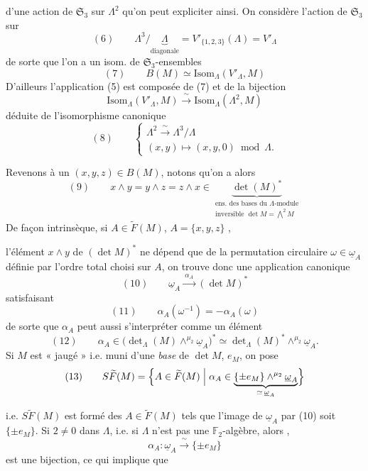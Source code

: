 \documentclass[11pt,a4paper]{article}
\begin{document}
d'une action de $\mathfrak{S}_3$ sur  $\Lambda^2$ qu'on peut expliciter ainsi. On considère l'action de $\mathfrak{S}_3$ sur
\[
(6)\qquad \Lambda^3/\underbrace{\Lambda}_{\text{diagonale}} = V'_{\{1,2,3\}}(\Lambda) = V'_\Lambda
\]
de sorte que l'on a un isom.  de $\mathfrak{S}_3$-ensembles
\[
(7)\qquad B(M) \simeq \mathrm{Isom}_\Lambda(V'_\Lambda, M)
\]
D'ailleurs l'application (5) est composée de (7) et de la bijection
\[
\mathrm{Isom}_\Lambda(V'_\Lambda, M) \xrightarrow{\ \sim\ } \mathrm{Isom}_\Lambda(\Lambda^2, M)
\]
déduite de l'isomorphisme canonique
\[
(8)\qquad \begin{cases} \Lambda^2 \xrightarrow{\ \sim\ } \Lambda^3/\Lambda \\ (x,y) \longmapsto (x,y,0) \bmod \Lambda . \end{cases}
\]

Revenons à un $(x,y,z) \in B(M)$, notons qu'on a alors
\[
(9)\qquad x \wedge y = y \wedge z = z \wedge x \in \underbrace{\det(M)^*}_{\substack{\text{ens. des bases du } \Lambda\text{-module} \\ \text{inversible } \det M = \bigwedge^2 M}}
\]
De façon intrinsèque, si $A \in \widetilde{F}(M)$,    $A = \{x,y,z\}$ ,

l'élément $x \wedge y$ de $(\det M)^*$ ne dépend que de la permutation circulaire $\omega \in \underline{\omega}_A$ définie par l'ordre total choisi sur $A$, on trouve donc une application canonique
\[
(10)\qquad \underline{\omega}_A \xrightarrow{\ \alpha_A\ } (\det M)^*
\]
satisfaisant
\[
(11)\qquad \alpha_A(\omega^{-1}) = -\alpha_A(\omega)
\]
de sorte que $\alpha_A$ peut aussi s'interpréter comme un élément
\[
(12)\qquad \alpha_A \in \bigl(\det\nolimits_\Lambda(M) \wedge^{\mu_2} \underline{\omega}_A\bigr)^* \simeq \det\nolimits_\Lambda(M)^* \wedge^{\mu_2} \underline{\omega}_A .
\]
 Si $M$ est « jaugé » i.e. muni d'une \emph{base} de $\det M$,  $e_M$, on pose
\[
(13)\qquad S\widetilde{F}(M) = \Bigl\{ A \in \widetilde{F}(M) \Bigm| \alpha_A \in \underbrace{\{\pm e_M\} \wedge^{\mu_2} \underline{\omega}_A}_{\simeq\, \underline{\omega}_A} \Bigr\}
\]

i.e. $S\widetilde{F}(M)$ est formé des $A \in \widetilde{F}(M)$ tels que l'image de $\underline{\omega}_A$ par (10) soit $\{\pm e_M\}$. Si $2 \neq 0$ dans $\Lambda$, i.e. si $\Lambda$ n'est pas une $\mathbb{F}_2$-algèbre, alors , 
\[
\alpha_A : \underline{\omega}_A \xrightarrow{\ \sim\ } \{\pm e_M\}
\]
est une bijection, ce qui implique que
\end{document}
